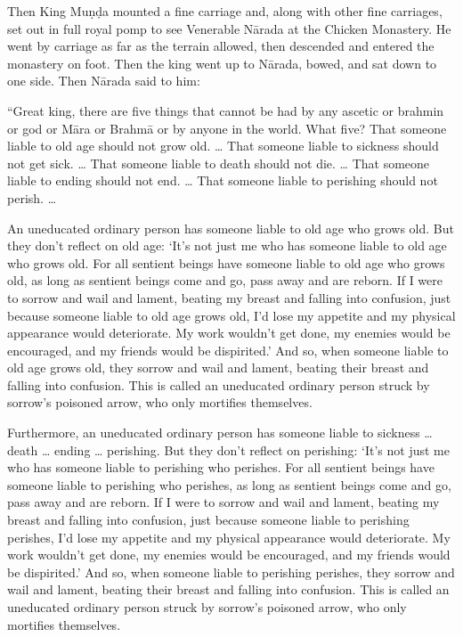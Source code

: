 \documentclass[12pt,openany]{book}%
\begin{document}
Then King \textsanskrit{Muṇḍa} mounted a fine carriage and, along with other fine carriages, set out in full royal pomp to see Venerable \textsanskrit{Nārada} at the Chicken Monastery. He went by carriage as far as the terrain allowed, then descended and entered the monastery on foot. Then the king went up to \textsanskrit{Nārada}, bowed, and sat down to one side. Then \textsanskrit{Nārada} said to him: 

“Great king, there are five things that cannot be had by any ascetic or brahmin or god or \textsanskrit{Māra} or \textsanskrit{Brahmā} or by anyone in the world. What five? That someone liable to old age should not grow old. … That someone liable to sickness should not get sick. … That someone liable to death should not die. … That someone liable to ending should not end. … That someone liable to perishing should not perish. … 

An uneducated ordinary person has someone liable to old age who grows old. But they don’t reflect on old age: ‘It’s not just me who has someone liable to old age who grows old. For all sentient beings have someone liable to old age who grows old, as long as sentient beings come and go, pass away and are reborn. If I were to sorrow and wail and lament, beating my breast and falling into confusion, just because someone liable to old age grows old, I’d lose my appetite and my physical appearance would deteriorate. My work wouldn’t get done, my enemies would be encouraged, and my friends would be dispirited.’ And so, when someone liable to old age grows old, they sorrow and wail and lament, beating their breast and falling into confusion. This is called an uneducated ordinary person struck by sorrow’s poisoned arrow, who only mortifies themselves. 

Furthermore, an uneducated ordinary person has someone liable to sickness … death … ending … perishing. But they don’t reflect on perishing: ‘It’s not just me who has someone liable to perishing who perishes. For all sentient beings have someone liable to perishing who perishes, as long as sentient beings come and go, pass away and are reborn. If I were to sorrow and wail and lament, beating my breast and falling into confusion, just because someone liable to perishing perishes, I’d lose my appetite and my physical appearance would deteriorate. My work wouldn’t get done, my enemies would be encouraged, and my friends would be dispirited.’ And so, when someone liable to perishing perishes, they sorrow and wail and lament, beating their breast and falling into confusion. This is called an uneducated ordinary person struck by sorrow’s poisoned arrow, who only mortifies themselves. 
\end{document}
